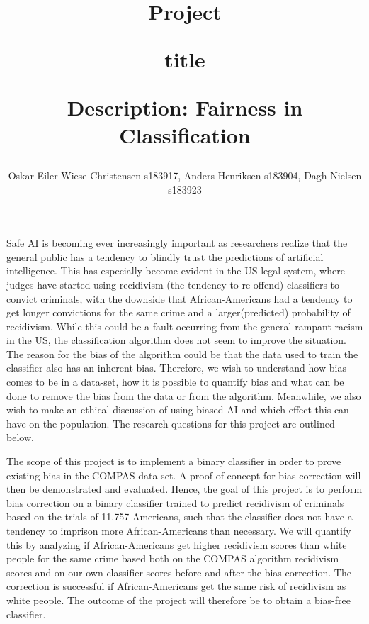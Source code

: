 \documentclass[11pt, fleqn]{article}
\title{Project \part{title}Description: Fairness in Classification}
\author{\small Oskar Eiler Wiese Christensen s183917, Anders Henriksen s183904, Dagh Nielsen s183923}
\date{}
\begin{document}
	\maketitle
	\vspace*{-0.65cm}	
	\noindent
	Safe AI is becoming ever increasingly important as researchers realize that the general public has a tendency to blindly trust the predictions of artificial intelligence. This has especially become evident in the US legal system, where judges have started using recidivism (the tendency to re-offend) classifiers to convict criminals, with the downside that African-Americans had a tendency to get longer convictions for the same crime and a larger(predicted) probability of recidivism. While this could be a fault occurring from the general rampant racism in the US, the classification algorithm does not seem to improve the situation. The reason for the bias of the algorithm could be that the data used to train the classifier also has an inherent bias. Therefore, we wish to understand how bias comes to be in a data-set, how it is possible to quantify bias and what can be done to remove the bias from the data or from the algorithm. Meanwhile, we also wish to make an ethical discussion of using biased AI and which effect this can have on the population. The research questions for this project are outlined below. 
	
	The scope of this project is to implement a binary classifier in order to prove existing bias in the COMPAS data-set. A proof of concept for bias correction will then be demonstrated and evaluated. Hence, the goal of this project is to perform bias correction on a binary classifier trained to predict recidivism of criminals based on the trials of 11.757 Americans, such that the classifier does not have a tendency to imprison more African-Americans than necessary. We will quantify this by analyzing if African-Americans get higher recidivism scores than white people for the same crime based both on the COMPAS algorithm recidivism scores and on our own classifier scores before and after the bias correction. The correction is successful if African-Americans get the same risk of recidivism as white people. The outcome of the project will therefore be to obtain a bias-free classifier.
	
	
\end{document}
